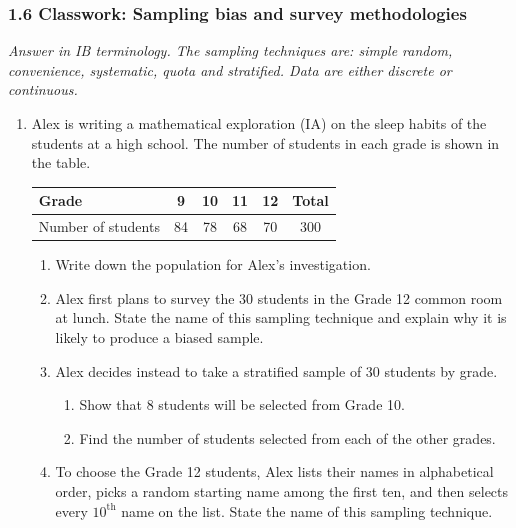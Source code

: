 \documentclass[12pt, twoside]{article}
\begin{document}
\subsubsection*{1.6 Classwork: Sampling bias and survey methodologies}

\emph{Answer in IB terminology. The sampling techniques are: simple random,
convenience, systematic, quota and stratified. Data are either discrete
or continuous.}

\begin{enumerate}[itemsep=0.15cm]

\item[1.]

Alex is writing a mathematical exploration (IA) on the sleep habits of
the students at a high school. The number of students in each grade is
shown in the table.

\begin{center}
\setlength{\tabcolsep}{10pt}\renewcommand{\arraystretch}{1.2}
\begin{tabular}{|l|c|c|c|c|c|}
\hline
Grade & 9 & 10 & 11 & 12 & Total \\
\hline
Number of students & 84 & 78 & 68 & 70 & 300 \\
\hline
\end{tabular}
\end{center}

\begin{enumerate}[itemsep=0.1cm]
  \item Write down the population for Alex's investigation.
  \item Alex first plans to survey the $30$ students in the Grade 12
  common room at lunch. State the name of this sampling technique and
  explain why it is likely to produce a biased sample.
  \item Alex decides instead to take a stratified sample of $30$
  students by grade.
  \begin{enumerate}[label=(\roman*)]
    \item Show that $8$ students will be selected from Grade 10.
    \item Find the number of students selected from each of the
    other grades.
  \end{enumerate}
  \item To choose the Grade 12 students, Alex lists their names in
  alphabetical order, picks a random starting name among the first
  ten, and then selects every $10^{\text{th}}$ name on the list. State
  the name of this sampling technique.
\end{enumerate}


\end{enumerate}
\end{document}
